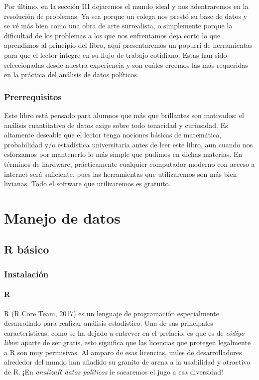 \documentclass[]{book}
\begin{document}
 Por último, en la sección III dejaremos el mundo ideal y nos
adentraremos en la resolución de problemas. Ya sea porque un colega nos
prestó su base de datos y se vé más bien como una obra de arte
surrealista, o simplemente porque la dificultad de los problemas a los
que nos enfrentamos deja corto lo que aprendimos al principio del libro,
aquí presentaremos un popurrí de herramientas para que el lector integre
en su flujo de trabajo cotidiano. Estas han sido seleccionadas desde
nuestra experiencia y son cuáles creemos las más requeridas en la
práctica del análisis de datos políticos.

\section{Prerrequisitos}\label{prerrequisitos}

Este libro está pensado para alumnos que más que brillantes son
motivados: el análisis cuantitativo de datos exige sobre todo tenacidad
y curiosidad. Es altamente deseable que el lector tenga nociones básicas
de matemática, probabilidad y/o estadística universitaria antes de leer
este libro, aun cuando nos esforzamos por mantenerlo lo más simple que
pudimos en dichas materias. En términos de hardware, prácticamente
cualquier computador moderno con acceso a internet será suficiente, pues
las herramientas que utilizaremos son más bien livianas. Todo el
software que utilizaremos es gratuito.

\part{Manejo de datos}\label{part-manejo-de-datos}

\chapter{R básico}\label{rbas}

\section{Instalación}\label{instalacion}

\subsection{R}\label{r}

R (R Core Team, 2017) es un lenguaje de programación especialmente
desarrollado para realizar análisis estadístico. Una de sus principales
características, como se ha dejado a entrever en el prefacio, es que es
de \emph{código libre}: aparte de ser gratis, esto significa que las
licencias que protegen legalmente a R son muy permisivas. Al amparo de
esas licencias, miles de desarrolladores alrededor del mundo han añadido
su granito de arena a la usabilidad y atractivo de R. ¡En \emph{analizaR
datos políticos} le sacaremos el jugo a esa diversidad!
\end{document}
